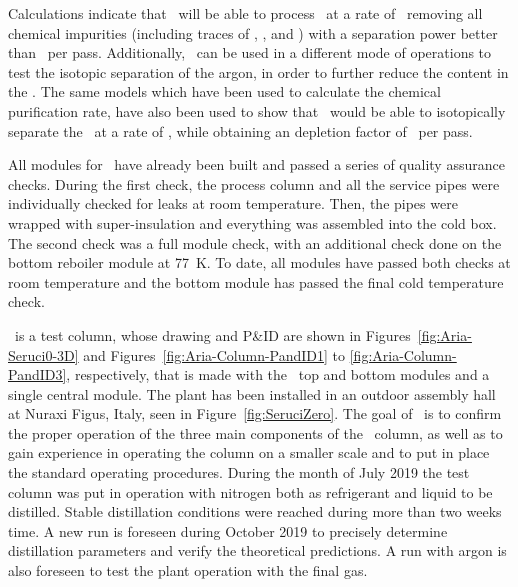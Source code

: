 Calculations indicate that \SeruciOne\ will be able to process \UAr\ at a rate of \AriaChemicalRate\ removing all chemical impurities (including traces of , , and ) with a separation power better than \AriaChemicalPerPass\ per pass.  Additionally, \SeruciOne\ can be used in a different mode of operations to test the isotopic separation of the argon, in order to further reduce the  content in the \UAr.  The same models which have been used to calculate the chemical purification rate, have also been used to show that \SeruciOne\ would be able to isotopically separate the \UAr\ at a rate of \AriaSeruciOneRate, while obtaining an  depletion factor of \AriaDepletionPerPass\ per pass. 

All modules for \SeruciOne\ have already been built and passed a series of quality assurance checks.  During the first check, the process column and all the service pipes were individually checked for leaks at room temperature.  Then, the pipes were wrapped with super-insulation and everything was assembled into the cold box.  The second check was a full module check, with an additional check done on the bottom reboiler module at \SI{77}{\kelvin}.  To date, all modules have passed both checks at room temperature and the bottom module has passed the final cold temperature check.  

\SeruciZero\ is a  test column, whose drawing and  P\&ID are shown in 
Figures~\ref{fig:Aria-Seruci0-3D} and  Figures~\ref{fig:Aria-Column-PandID1} to \ref{fig:Aria-Column-PandID3}, respectively, that is made with the  \SeruciOne\ top and bottom modules and  a single central module. The plant  has been installed in an outdoor assembly hall at Nuraxi Figus, Italy, seen in Figure~\ref{fig:SeruciZero}.  The goal  of \SeruciZero\ is  to confirm the proper operation of the three main components of the \SeruciOne\ column, as well as to gain experience in operating the column on a smaller scale and to put in place the standard operating procedures.  
During the month of July 2019 the test column was put in operation with nitrogen both as refrigerant and liquid to be distilled. Stable distillation conditions were reached during more than two weeks time. A new run is foreseen during October 2019 to precisely determine distillation parameters and verify the theoretical predictions. A run with argon is also foreseen to test the plant operation with the final gas.

